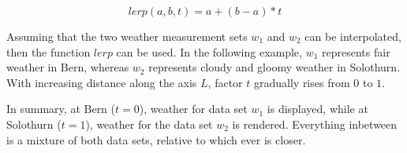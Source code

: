 $$lerp(a, b, t) = a + (b - a) * t$$

\noindent
Assuming that the two weather measurement sets $w_1$ and $w_2$ can be interpolated, then the function $lerp$ can be used.
In the following example, $w_1$ represents fair weather in Bern, whereas $w_2$ represents cloudy and gloomy weather in Solothurn.
With increasing distance along the axis \color{darkercyan}$L$\color{black}, factor $t$ gradually rises from $0$ to $1$.

\begin{figure}[H]
    \centering
    \label{img:tikz:shadersetup}       
\end{figure}

\noindent
In summary,  at Bern ($t = 0$), weather for data set $w_1$ is displayed, while at Solothurn ($t = 1$), weather for the data set $w_2$ is rendered.
Everything inbetween is a mixture of both data sets, relative to which ever is closer.